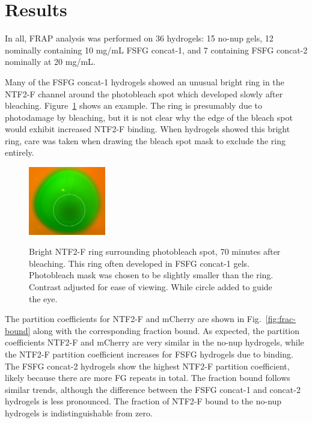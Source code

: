 \section{Results}

In all, FRAP analysis was performed on 36 hydrogels: 15 no-nup gels, 12 nominally containing 10 mg/mL FSFG concat-1, and 7 containing FSFG concat-2 nominally at 20 mg/mL. %

Many of the FSFG concat-1 hydrogels showed an unusual bright ring in the NTF2-F channel around the photobleach spot which developed slowly after bleaching.  Figure~\ref{fig:ring} shows an example.  The ring is presumably due to photodamage by bleaching, but it is not clear why the edge of the bleach spot would exhibit increased NTF2-F binding.  When hydrogels showed this bright ring, care was taken when drawing the bleach spot mask to exclude the ring entirely.

\begin{figure}
\caption{Bright NTF2-F ring surrounding photobleach spot, 70 minutes after bleaching.  This ring often developed in FSFG concat-1 gels.  Photobleach mask was chosen to be slightly smaller than the ring.  Contrast adjusted for ease of viewing. While circle added to guide the eye.\\}
\centering
\includegraphics[width=0.3\textwidth]{figs/ch04/ring}
\label{fig:ring}
\end{figure} 

The partition coefficients for NTF2-F and mCherry are shown in Fig.~\ref{fig:frac-bound} along with the corresponding fraction bound.  As expected, the partition coefficients NTF2-F and mCherry are very similar in the no-nup hydrogels, while the NTF2-F partition coefficient increases for FSFG hydrogels due to binding.  The FSFG concat-2 hydrogels show the highest NTF2-F partition coefficient, likely because there are more FG repeats in total.  The fraction bound follows similar trends, although the difference between the FSFG concat-1 and concat-2 hydrogels is less pronounced.  The fraction of NTF2-F bound to the no-nup hydrogels is indistinguishable from zero.

